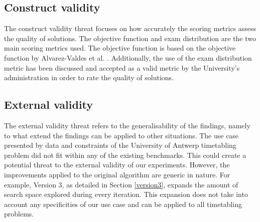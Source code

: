 
\subsection{Construct validity}

The construct validity threat focuses on how accurately the scoring metrics assess the quality of solutions. The objective function and exam distribution are the two main scoring metrics used. The objective function is based on the objective function by Alvarez-Valdes et al. \cite{alvarez1997}. Additionally, the use of the exam distribution metric has been discussed and accepted as a valid metric by the University's administration in order to rate the quality of solutions.

\subsection{External validity}

The external validity threat refers to the generalisability of the findings, namely to what extend the findings can be applied to other situations. The use case presented by data and constraints of the University of Antwerp timetabling problem did not fit within any of the existing benchmarks. This could create a potential threat to the external validity of our experiments. However, the improvements applied to the original algorithm are generic in nature. For example, Version 3, as detailed in Section \ref{version3}, expands the amount of search space explored during every iteration. This expansion does not take into account any specificities of our use case and can be applied to all timetabling problems.

